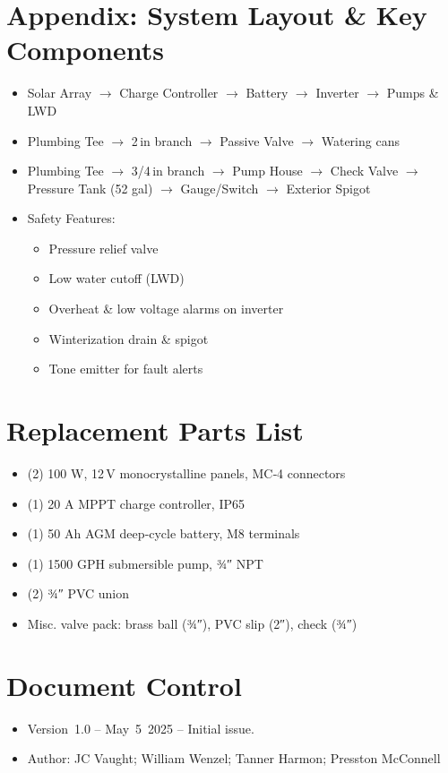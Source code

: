 \documentclass[11pt]{article}
\begin{document}
\newpage\section*{Appendix: System Layout \& Key Components}
\begin{itemize}[leftmargin=*]
  \item Solar Array $\to$ Charge Controller $\to$ Battery $\to$ Inverter $\to$ Pumps \& LWD
  \item Plumbing Tee $\to$ 2\,in branch $\to$ Passive Valve $\to$ Watering cans
  \item Plumbing Tee $\to$ 3/4\,in branch $\to$ Pump House $\to$ Check Valve $\to$ Pressure Tank (52 gal) $\to$ Gauge/Switch $\to$ Exterior Spigot
  \item Safety Features:
    \begin{itemize}[leftmargin=*]
      \item Pressure relief valve
      \item Low water cutoff (LWD)
      \item Overheat \& low voltage alarms on inverter
      \item Winterization drain \& spigot
      \item Tone emitter for fault alerts
    \end{itemize}
\end{itemize}

\section*{Replacement Parts List}
\begin{itemize}
  \item (2) 100 W, 12 V monocrystalline panels, MC‑4 connectors
  \item (1) 20 A MPPT charge controller, IP65
  \item (1) 50 Ah AGM deep‑cycle battery, M8 terminals
  \item (1) 1500 GPH submersible pump, ¾″ NPT
  \item (2) ¾″ PVC union
  \item Misc. valve pack: brass ball (¾″), PVC slip (2″), check (¾″)
\end{itemize}

\section*{Document Control}
\begin{itemize}
  \item Version 1.0 – May 5 2025 – Initial issue.
  \item Author: JC Vaught; William Wenzel; Tanner Harmon; Presston McConnell
\end{itemize}
\end{document}
